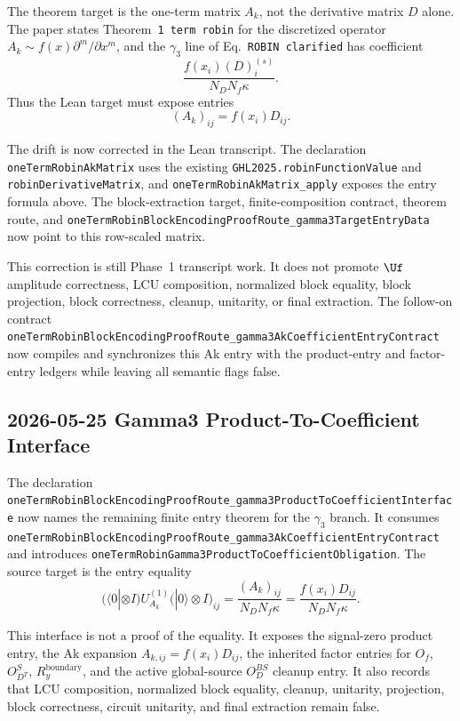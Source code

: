 The theorem target is the one-term matrix \(A_k\), not the derivative matrix
\(D\) alone.  The paper states Theorem~\texttt{1 term robin} for the
discretized operator \(A_k \sim f(x)\partial^m/\partial x^m\), and the
\(\gamma_3\) line of Eq.~\texttt{ROBIN clarified} has coefficient
\[
  \frac{f(x_i)(D)_i^{(s)}}{N_DN_f\kappa}.
\]
Thus the Lean target must expose entries
\[
  (A_k)_{ij}=f(x_i)D_{ij}.
\]

The drift is now corrected in the Lean transcript.  The declaration
\texttt{oneTermRobinAkMatrix} uses the existing
\texttt{GHL2025.robinFunctionValue} and \texttt{robinDerivativeMatrix}, and
\texttt{oneTermRobinAkMatrix\_apply} exposes the entry formula above.  The
block-extraction target, finite-composition contract, theorem route, and
\texttt{oneTermRobinBlockEncodingProofRoute\_gamma3TargetEntryData} now point
to this row-scaled matrix.

This correction is still Phase~1 transcript work.  It does not promote
\(\Uf\) amplitude correctness, LCU composition, normalized block equality,
block projection, block correctness, cleanup, unitarity, or final extraction.
The follow-on contract
\texttt{oneTermRobinBlockEncodingProofRoute\_gamma3AkCoefficientEntryContract}
now compiles and synchronizes this Ak entry with the product-entry and
factor-entry ledgers while leaving all semantic flags false.

\subsection{2026-05-25 Gamma3 Product-To-Coefficient Interface}

The declaration
\texttt{oneTermRobinBlockEncodingProofRoute\_gamma3ProductToCoefficientInterface}
now names the remaining finite entry theorem for the \(\gamma_3\) branch.
It consumes
\texttt{oneTermRobinBlockEncodingProofRoute\_gamma3AkCoefficientEntryContract}
and introduces
\texttt{oneTermRobinGamma3ProductToCoefficientObligation}.  The source target
is the entry equality
\[
  \bigl(\langle 0| \otimes I\bigr)U_{A_k}^{(1)}
  \bigl(|0\rangle \otimes I\bigr)_{ij}
  =
  \frac{(A_k)_{ij}}{N_DN_f\kappa}
  =
  \frac{f(x_i)D_{ij}}{N_DN_f\kappa}.
\]

This interface is not a proof of the equality.  It exposes the signal-zero
product entry, the Ak expansion \(A_{k,ij}=f(x_i)D_{ij}\), the inherited
factor entries for \(O_f\), \(O_{D^T}^{S}\), \(R_y^{\mathrm{boundary}}\), and
the active global-source \(O_D^{BS}\) cleanup entry.  It also records that
LCU composition, normalized block equality, cleanup, unitarity, projection,
block correctness, circuit unitarity, and final extraction remain false.

